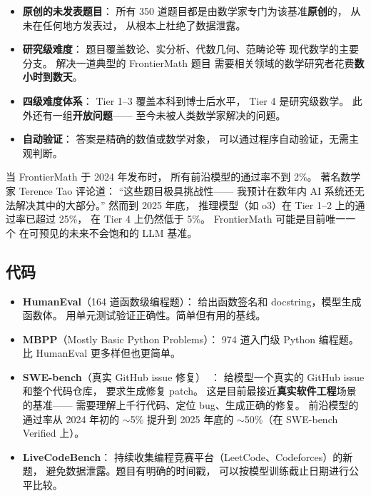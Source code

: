 \begin{itemize}[noitemsep]
  \item \textbf{原创的未发表题目}：
        所有 350 道题目都是由数学家专门为该基准\textbf{原创}的，
        从未在任何地方发表过，
        从根本上杜绝了数据泄露。
  \item \textbf{研究级难度}：
        题目覆盖数论、实分析、代数几何、范畴论等
        现代数学的主要分支。
        解决一道典型的 FrontierMath 题目
        需要相关领域的数学研究者花费\textbf{数小时到数天}。
  \item \textbf{四级难度体系}：
        Tier 1--3 覆盖本科到博士后水平，
        Tier 4 是研究级数学。
        此外还有一组\textbf{开放问题}——
        至今未被人类数学家解决的问题。
  \item \textbf{自动验证}：
        答案是精确的数值或数学对象，
        可以通过程序自动验证，无需主观判断。
\end{itemize}

\begin{keybox}
当 FrontierMath 于 2024 年发布时，
所有前沿模型的通过率不到 2\%。
著名数学家 Terence Tao 评论道：
``这些题目极具挑战性——
我预计在数年内 AI 系统还无法解决其中的大部分。''
然而到 2025 年底，
推理模型（如 o3）在 Tier 1--2 上的通过率已超过 25\%，
在 Tier 4 上仍然低于 5\%。
FrontierMath 可能是目前唯一一个
在可预见的未来不会饱和的 LLM 基准。
\end{keybox}

\subsection{代码}
\begin{itemize}[noitemsep]
  \item \textbf{HumanEval}（164 道函数级编程题）：
        给出函数签名和 docstring，模型生成函数体。
        用单元测试验证正确性。简单但有用的基线。
  \item \textbf{MBPP}（Mostly Basic Python Problems）：
        974 道入门级 Python 编程题。比 HumanEval 更多样但也更简单。
  \item \textbf{SWE-bench}（真实 GitHub issue 修复）~\cite{jimenez2024swebench}：
        给模型一个真实的 GitHub issue 和整个代码仓库，
        要求生成修复 patch。
        这是目前最接近\textbf{真实软件工程}场景的基准——
        需要理解上千行代码、定位 bug、生成正确的修复。
        前沿模型的通过率从 2024 年初的 $\sim$5\%
        提升到 2025 年底的 $\sim$50\%（在 SWE-bench Verified 上）。
  \item \textbf{LiveCodeBench}：
        持续收集编程竞赛平台（LeetCode、Codeforces）的新题，
        避免数据泄露。题目有明确的时间戳，
        可以按模型训练截止日期进行公平比较。
\end{itemize}

